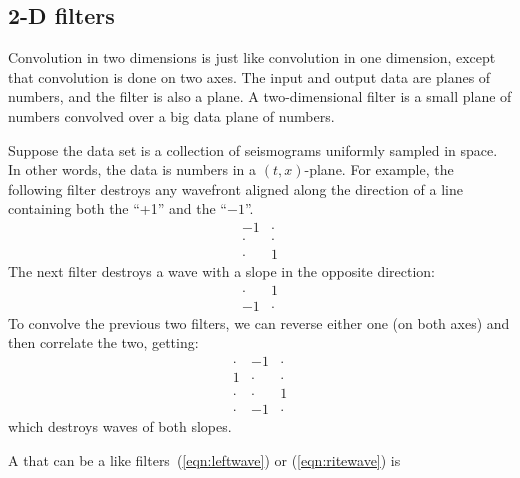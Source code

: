 \subsection{2-D filters}
Convolution in two dimensions is just like convolution
in one dimension, except that convolution is done on two axes.
The input and output data are planes of numbers,
and the filter is also a plane.
A two-dimensional filter  is
a small plane of numbers 
convolved over a big data plane of numbers.
\par
Suppose the data set is a collection of seismograms
uniformly sampled in space.
In other words, the data is numbers in a $(t,x)$-plane.
For example, the following filter
destroys any wavefront
aligned along the direction of a line containing both the ``+1''
and the ``$-1$''.
\begin{equation}
   \begin{array}{cc}
        -1     &\cdot  \\
        \cdot  &\cdot  \\
        \cdot  &1      \end{array}
\label{eqn:leftwave}
\end{equation}
The next filter destroys a wave with a slope
in the opposite direction:
\begin{equation}
   \begin{array}{cc}
        \cdot  &1     \\
        -1     &\cdot  \end{array}
\label{eqn:ritewave}
\end{equation}
To convolve the previous two filters,
we can reverse either one (on both axes) and then correlate the two,
getting:
\begin{equation}
        \begin{array}{ccc}
              \cdot &  -1  &\cdot      \\
                 1  &\cdot &\cdot      \\
              \cdot &\cdot &  1        \\
              \cdot &  -1  &\cdot      \end{array}
\label{eqn:twowave}
\end{equation}
which destroys waves of both slopes.
\par
A 
that can be a  like filters~(\ref{eqn:leftwave}) or (\ref{eqn:ritewave}) is
